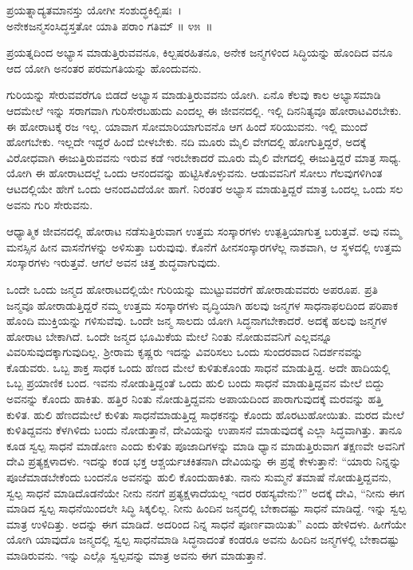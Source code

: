 \begin{shloka}
ಪ್ರಯತ್ನಾದ್ಯತಮಾನಸ್ತು ಯೋಗೀ ಸಂಶುದ್ಧಕಿಲ್ಬಿಷಃ~।\\ಅನೇಕಜನ್ಮಸಂಸಿದ್ಧಸ್ತತೋ ಯಾತಿ ಪರಾಂ ಗತಿಮ್ \hfill॥ ೪೫~॥ 
\end{shloka}

\begin{artha}
ಪ್ರಯತ್ನದಿಂದ ಅಭ್ಯಾಸ ಮಾಡುತ್ತಿರುವವನೂ, ಕಿಲ್ಬಷರಹಿತನೂ, ಅನೇಕ ಜನ್ಮಗಳಿಂದ ಸಿದ್ಧಿಯನ್ನು ಹೊಂದಿದ ವನೂ ಆದ ಯೋಗಿ ಅನಂತರ ಪರಮಗತಿಯನ್ನು ಹೊಂದುವನು.
\end{artha}

\newpage

ಗುರಿಯನ್ನು ಸೇರುವವರೆಗೂ ಬಿಡದೆ ಅಭ್ಯಾಸ ಮಾಡುತ್ತಿರುವವನು ಯೋಗಿ. ಏನೊ ಕೆಲವು ಕಾಲ ಅಭ್ಯಾಸಮಾಡಿ ಆದಮೇಲೆ ಇನ್ನು ಸರಾಗವಾಗಿ ಗುರಿಸೇರಬಹುದು ಎಂದಲ್ಲ ಈ ಜೀವನದಲ್ಲಿ. ಇಲ್ಲಿ ದಿನನಿತ್ಯವೂ ಹೋರಾಟವಿರಬೇಕು. ಈ ಹೋರಾಟಕ್ಕೆ ರಜ ಇಲ್ಲ. ಯಾವಾಗ ಸೋಮಾರಿಯಾಗುವನೊ ಆಗ ಹಿಂದೆ ಸರಿಯುವನು. ಇಲ್ಲಿ ಮುಂದೆ ಹೋಗಬೇಕು. ಇಲ್ಲದೇ ಇದ್ದರೆ ಹಿಂದೆ ಬೀಳಬೇಕು. ನದಿ ಮೂರು ಮೈಲಿ ವೇಗದಲ್ಲಿ ಹೋಗುತ್ತಿದ್ದರೆ, ಅದಕ್ಕೆ ವಿರೋಧವಾಗಿ ಈಜುತ್ತಿರುವವನು ಇರುವ ಕಡೆ ಇರಬೇಕಾದರೆ ಮೂರು ಮೈಲಿ ವೇಗದಲ್ಲಿ ಈಜುತ್ತಿದ್ದರೆ ಮಾತ್ರ ಸಾಧ್ಯ. ಯೋಗಿ ಈ ಹೋರಾಟದಲ್ಲೆ ಒಂದು ಆನಂದವನ್ನು ಹುಟ್ಟಿಸಿಕೊಳ್ಳುವನು. ಆಡುವವನಿಗೆ ಸೋಲು ಗೆಲವುಗಳಿಗಿಂತ ಆಟದಲ್ಲಿಯೇ ಹೇಗೆ ಒಂದು ಆನಂದವಿದೆಯೋ ಹಾಗೆ. ನಿರಂತರ ಅಭ್ಯಾಸ ಮಾಡುತ್ತಿದ್ದರೆ ಮಾತ್ರ ಒಂದಲ್ಲ ಒಂದು ಸಲ ಅವನು ಗುರಿ ಸೇರುವನು.

ಆಧ್ಯಾತ್ಮಿಕ ಜೀವನದಲ್ಲಿ ಹೋರಾಟ ನಡೆಸುತ್ತಿರುವಾಗ ಉತ್ತಮ ಸಂಸ್ಕಾರಗಳು ಉತ್ಪತ್ತಿ\-ಯಾಗುತ್ತ ಬರುತ್ತವೆ. ಅವು ನಮ್ಮ ಮನಸ್ಸಿನ ಹೀನ ವಾಸನೆಗಳನ್ನು ಅಳಿಸುತ್ತಾ ಬರುವುವು. ಕೊನೆಗೆ ಹೀನಸಂಸ್ಕಾರಗಳೆಲ್ಲ ನಾಶವಾಗಿ, ಆ ಸ್ಥಳದಲ್ಲಿ ಉತ್ತಮ ಸಂಸ್ಕಾರಗಳು ಇರುತ್ತವೆ. ಆಗಲೆ ಅವನ ಚಿತ್ತ ಶುದ್ಧವಾಗುವುದು. 

ಒಂದೇ ಒಂದು ಜನ್ಮದ ಹೋರಾಟದಲ್ಲಿಯೇ ಗುರಿಯನ್ನು ಮುಟ್ಟುವವರೆಗೆ ಹೋರಾಡುವವರು ಅಪರೂಪ. ಪ್ರತಿ ಜನ್ಮವೂ ಹೋರಾಡುತ್ತಿದ್ದರೆ ನಮ್ಮ ಉತ್ತಮ ಸಂಸ್ಕಾರಗಳು ವೃದ್ಧಿಯಾಗಿ ಹಲವು ಜನ್ಮಗಳ ಸಾಧನಾಫಲದಿಂದ ಪರಿಪಾಕ ಹೊಂದಿ ಮುಕ್ತಿಯನ್ನು ಗಳಿಸುವೆವು. ಒಂದೇ ಜನ್ಮ ಸಾಲದು ಯೋಗಿ ಸಿದ್ಧನಾಗಬೇಕಾದರೆ. ಅದಕ್ಕೆ ಹಲವು ಜನ್ಮಗಳ ಹೋರಾಟ ಬೇಕಾಗಿದೆ. ಒಂದೇ ಜನ್ಮದ ಭೂಮಿಕೆಯ ಮೇಲೆ ನಿಂತು ನೋಡುವವನಿಗೆ ಎಲ್ಲವನ್ನೂ ವಿವರಿಸುವುದಕ್ಕಾಗುವುದಿಲ್ಲ. ಶ‍್ರೀರಾಮ ಕೃಷ್ಣರು ಇದನ್ನು ವಿವರಿಸಲು ಒಂದು ಸುಂದರವಾದ ನಿದರ್ಶನವನ್ನು ಕೊಡುವರು. ಒಬ್ಬ ಶಾಕ್ತ ಸಾಧಕ ಒಂದು ಹೆಣದ ಮೇಲೆ ಕುಳಿತುಕೊಂಡು ಸಾಧನೆ ಮಾಡುತ್ತಿದ್ದ. ಅದೇ ಹಾದಿಯಲ್ಲಿ ಒಬ್ಬ ಪ್ರಯಾಣಿಕ ಬಂದ. ಇವನು ನೋಡುತ್ತಿದ್ದಂತೆ ಒಂದು ಹುಲಿ ಬಂದು ಸಾಧನೆ ಮಾಡುತ್ತಿದ್ದವನ ಮೇಲೆ ಬಿದ್ದು ಅವನನ್ನು ಕೊಂದು ಹಾಕಿತು. ಹತ್ತಿರ ನಿಂತು ನೋಡುತ್ತಿದ್ದವನು ಅಪಾಯದಿಂದ ಪಾರಾಗುವುದಕ್ಕೆ ಮರವನ್ನು ಹತ್ತಿ ಕುಳಿತ. ಹುಲಿ ಹೆಣದಮೇಲೆ ಕುಳಿತು ಸಾಧನೆಮಾಡುತ್ತಿದ್ದ ಸಾಧಕನನ್ನು ಕೊಂದು ಹೊರಟುಹೋಯಿತು. ಮರದ ಮೇಲೆ ಕುಳಿತಿದ್ದವನು ಕೆಳಗಿಳಿದು ಬಂದು ನೋಡುತ್ತಾನೆ, ದೇವಿಯನ್ನು ಉಪಾಸನೆ ಮಾಡುವುದಕ್ಕೆ ಎಲ್ಲಾ ಸಿದ್ಧವಾಗಿತ್ತು. ತಾನೂ ಕೂಡ ಸ್ವಲ್ಪ ಸಾಧನೆ ಮಾಡೋಣ ಎಂದು ಕುಳಿತು ಪೂಜಾದಿಗಳನ್ನು ಮಾಡಿ ಧ್ಯಾನ ಮಾಡುತ್ತಿರುವಾಗ ತಕ್ಷಣವೇ ಅವನಿಗೆ ದೇವಿ ಪ್ರತ್ಯಕ್ಷಳಾದಳು. ಇದನ್ನು ಕಂಡ ಭಕ್ತ ಆಶ್ಚರ್ಯಚಕಿತನಾಗಿ ದೇವಿಯನ್ನು ಈ ಪ್ರಶ್ನೆ ಕೇಳುತ್ತಾನೆ: “ಯಾರು ನಿನ್ನನ್ನು ಪೂಜೆಮಾಡಬೇಕೆಂದು ಬಂದನೊ ಅವನನ್ನು ಹುಲಿ ಕೊಂದುಹಾಕಿತು. ನಾನು ಸುಮ್ಮನೆ ತಮಾಷೆ ನೋಡುತ್ತಿದ್ದವನು, ಸ್ವಲ್ಪ ಸಾಧನೆ ಮಾಡಿದೊಡನೆಯೇ ನೀನು ನನಗೆ ಪ್ರತ್ಯಕ್ಷಳಾದೆಯಲ್ಲ ಇದರ ರಹಸ್ಯವೇನು?” ಅದಕ್ಕೆ ದೇವಿ, “ನೀನು ಈಗ ಮಾಡಿದ ಸ್ವಲ್ಪ ಸಾಧನೆಯಿಂದಲೇ ಸಿದ್ಧಿ ಸಿಕ್ಕಲಿಲ್ಲ. ನೀನು ಹಿಂದಿನ ಜನ್ಮದಲ್ಲಿ ಬೇಕಾದಷ್ಟು ಸಾಧನೆ ಮಾಡಿದ್ದೆ. ಇನ್ನು ಸ್ವಲ್ಪ ಮಾತ್ರ ಉಳಿದಿತ್ತು. ಅದನ್ನು ಈಗ ಮಾಡಿದೆ. ಅದರಿಂದ ನಿನ್ನ ಸಾಧನೆ ಪೂರ್ಣವಾಯಿತು” ಎಂದು ಹೇಳಿದಳು. ಹೀಗೆಯೇ ಯೋಗಿ ಯಾವುದೊ ಜನ್ಮದಲ್ಲಿ ಸ್ವಲ್ಪ ಸಾಧನೆಮಾಡಿ ಸಿದ್ಧನಾದಂತೆ ಕಂಡರೂ ಅವನು ಹಿಂದಿನ ಜನ್ಮಗಳಲ್ಲಿ ಬೇಕಾದಷ್ಟು ಮಾಡಿರುವನು. ಇನ್ನು ಎಲ್ಲೊ ಸ್ವಲ್ಪವನ್ನು ಮಾತ್ರ ಅವನು ಈಗ ಮಾಡುತ್ತಾನೆ.

